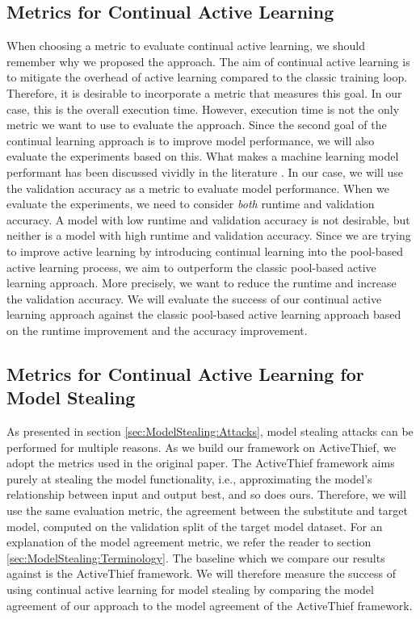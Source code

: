 \subsection{Metrics for Continual Active Learning}
\label{sec:Methodology:Metrics:CAL}
When choosing a metric to evaluate continual active learning, we should remember why we proposed the approach. The aim of continual active learning is to mitigate the
overhead of active learning compared to the classic training loop. Therefore, it is desirable to incorporate a metric that measures this goal. In our case, this is
the overall execution time. However, execution time is not the only metric we want to use to evaluate the approach. Since the second goal of the continual learning
approach is to improve model performance, we will also evaluate the experiments based on this. What makes a machine learning model performant has been discussed vividly
in the literature \cite{flach2019performance}. In our case, we will use the validation accuracy as a metric to evaluate model performance. When we evaluate the experiments,
we need to consider \textit{both} runtime and validation accuracy. A model with low runtime and validation accuracy is not desirable,
but neither is a model with high runtime and validation accuracy. Since we are trying to improve active learning by introducing continual learning into the pool-based 
active learning process, we aim to outperform the classic pool-based active learning approach. More precisely, we want to reduce the runtime and increase the validation
accuracy. We will evaluate the success of our continual active learning approach against the classic pool-based active learning approach based on the runtime improvement
and the accuracy improvement. 


\subsection{Metrics for Continual Active Learning for Model Stealing}
\label{sec:Methodlogy:Metrics:CALMS}
As presented in section \ref{sec:ModelStealing:Attacks}, model stealing attacks can be performed for multiple reasons. As we build our framework on ActiveThief, we adopt
the metrics used in the original paper. The ActiveThief framework aims purely at stealing the model functionality, i.e., approximating the model's relationship
between input and output best, and so does ours. Therefore, we will use the same evaluation metric, the agreement between the substitute and target model,
computed on the validation split of the target model dataset. For an explanation of the model agreement metric, we refer the reader to section \ref{sec:ModelStealing:Terminology}.
The baseline which we compare our results against is the ActiveThief framework. We will therefore measure the success of using continual active learning for model stealing by comparing
the model agreement of our approach to the model agreement of the ActiveThief framework.
